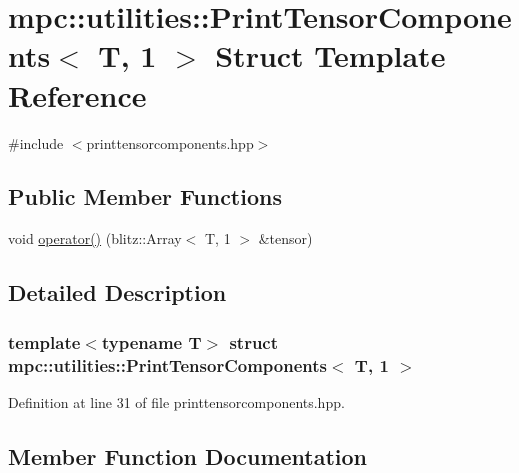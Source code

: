 \hypertarget{structmpc_1_1utilities_1_1_print_tensor_components_3_01_t_00_011_01_4}{}\section{mpc\+:\+:utilities\+:\+:Print\+Tensor\+Components$<$ T, 1 $>$ Struct Template Reference}
\label{structmpc_1_1utilities_1_1_print_tensor_components_3_01_t_00_011_01_4}


{\ttfamily \#include $<$printtensorcomponents.\+hpp$>$}

\subsection*{Public Member Functions}
\begin{DoxyCompactItemize}
\item 
void \mbox{\hyperlink{structmpc_1_1utilities_1_1_print_tensor_components_3_01_t_00_011_01_4_ad4b1a6e828871fe3b7bf3f2053dc9f26}{operator()}} (blitz\+::\+Array$<$ T, 1 $>$ \&tensor)
\end{DoxyCompactItemize}


\subsection{Detailed Description}
\subsubsection*{template$<$typename T$>$\newline
struct mpc\+::utilities\+::\+Print\+Tensor\+Components$<$ T, 1 $>$}



Definition at line 31 of file printtensorcomponents.\+hpp.



\subsection{Member Function Documentation}
\mbox{\label{structmpc_1_1utilities_1_1_print_tensor_components_3_01_t_00_011_01_4_ad4b1a6e828871fe3b7bf3f2053dc9f26}} 
